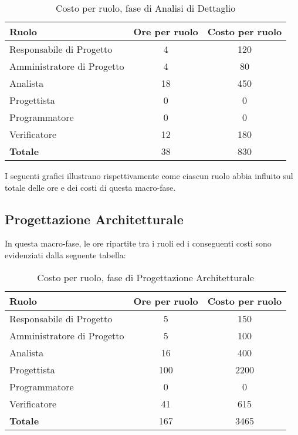 \begin{table}[h]
	\centering
	\begin{tabular}{|l|c|c|}
		\toprule
		\textbf{Ruolo} & \textbf{Ore per ruolo} & \textbf{Costo per ruolo} \\
		
		\midrule
		Responsabile di Progetto & 4 & 120 \\
		Amministratore di Progetto & 4 & 80 \\ 
		Analista & 18 & 450 \\
		Progettista & 0 & 0 \\
		Programmatore & 0 & 0 \\
		Verificatore & 12 & 180 \\
		\midrule
		\textbf{Totale} & 38 & 830 \\
		
		\bottomrule
	\end{tabular}
	\caption{Costo per ruolo, fase di Analisi di Dettaglio}
\end{table}

I seguenti grafici illustrano rispettivamente come ciascun ruolo abbia influito sul totale delle ore e dei costi di questa macro-fase.

\subsection{Progettazione Architetturale}
In questa macro-fase, le ore ripartite tra i ruoli ed i conseguenti costi sono evidenziati dalla seguente tabella:

\begin{table}[h]
	\centering
	\begin{tabular}{|l|c|c|}
		\toprule
		\textbf{Ruolo} & \textbf{Ore per ruolo} & \textbf{Costo per ruolo} \\
		
		\midrule
		Responsabile di Progetto & 5 & 150 \\
		Amministratore di Progetto & 5 & 100 \\ 
		Analista & 16 & 400 \\
		Progettista & 100 & 2200 \\
		Programmatore & 0 & 0 \\
		Verificatore & 41 & 615 \\
		\midrule
		\textbf{Totale} & 167 & 3465 \\
		
		\bottomrule
	\end{tabular}
	\caption{Costo per ruolo, fase di Progettazione Architetturale}
\end{table}

